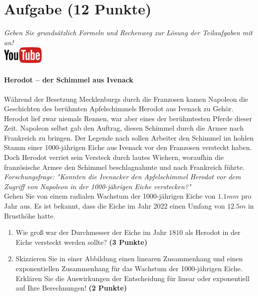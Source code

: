 \documentclass[a4paper, 10pt]{scrartcl}\usepackage[]{graphicx}\usepackage[]{xcolor}
\begin{document}
\section{Aufgabe \hfill (12 Punkte)}

\textit{Geben Sie grunds{\"a}tzlich Formeln und Rechenweg zur L{\"o}sung der
  Teilaufgaben mit an!} \\[1Ex]

\hfill\href{https://youtu.be/Fu8kN0Uj13Y}{\includegraphics[width =
  2cm]{img/youtube}} %
\hspace{2Ex}

\paragraph{Herodot – der Schimmel aus Ivenack}

W{\"a}hrend der Besetzung Mecklenburgs durch die Franzosen kamen Napoleon die
Geschichten des ber{\"u}hmten Apfelschimmels Herodot aus Ivenack zu
Geh{\"o}r. Herodot lief zwar niemals Rennen, war aber eines der ber{\"u}hmtesten
Pferde dieser Zeit. Napoleon selbst gab den Auftrag, diesen
Schimmel durch die Armee nach Frankreich zu bringen. Der Legende nach
sollen Arbeiter den Schimmel im hohlen Stamm einer 1000-j{\"a}hrigen Eiche aus Ivenack vor
den Franzosen versteckt haben. Doch Herodot verriet sein Versteck durch
lautes Wiehern, woraufhin die franz{\"o}sische Armee den Schimmel
beschlagnahmte und nach Frankreich f{\"u}hrte. \\



\textit{Forschungsfrage: "Konnten die Ivenacker den Apfelschimmel Herodot
  vor dem Zugriff von Napoleon in der 1000-j{\"a}hrigen Eiche verstecken?"} \\

Gehen Sie von einem radialen Wachstum der 1000-j{\"a}hrigen Eiche von
$1.1mm$ pro Jahr aus. Es ist bekannt, dass die Eiche im
Jahr 2022 einen Umfang von $12.5m$ in Brusth{\"o}he hatte.

\begin{enumerate}
\item Wie gro{\ss} war der Durchmesser der Eiche im Jahr $1810$ als
  Herodot in der Eiche versteckt werden sollte?
  \textbf{(3 Punkte)}
\item Skizzieren Sie in einer Abbildung einen linearen Zusammenhang und einen
exponentiellen Zusammenhang f{\"u}r das Wachstum der 1000-j{\"a}hrigen Eiche. Erkl{\"a}ren Sie die
Auswirkungen der Entscheidung f{\"u}r linear oder exponentiell auf Ihre
Berechnungen! \textbf{(2 Punkte)}
\end{enumerate}
 
\end{document}
